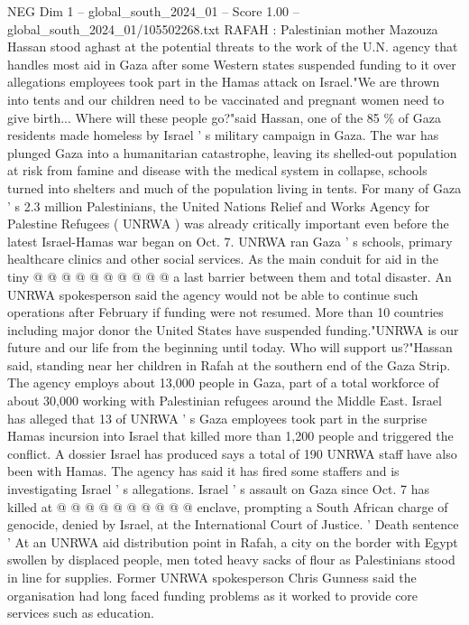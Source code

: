 \begin{textsample}{NEG Dim 1 – global\_south\_2024\_01 – Score 1.00 – global\_south\_2024\_01/105502268.txt}  \label{ex:f1_neg_352}
RAFAH : Palestinian mother Mazouza Hassan stood aghast at the potential threats to the work of the U.N. agency that handles most aid in Gaza after some Western states suspended funding to it over allegations employees took part in the Hamas attack on Israel."We are thrown into tents and our children need to be vaccinated and pregnant women need to give birth...
Where will these people go?"said Hassan, one of the 85 \% of Gaza residents made homeless by Israel ' s military campaign in Gaza.
The war has plunged Gaza into a humanitarian catastrophe, leaving its shelled-out population at risk from famine and disease with the medical system in collapse, schools turned into shelters and much of the population living in tents.
For many of Gaza ' s 2.3 million Palestinians, the United Nations Relief and Works Agency for Palestine Refugees ( UNRWA ) was already critically important even before the latest Israel-Hamas war began on Oct. 7.
UNRWA ran Gaza ' s schools, primary healthcare clinics and other social services.
As the main conduit for aid in the tiny @ @ @ @ @ @ @ @ @ @ a last barrier between them and total disaster.
An UNRWA spokesperson said the agency would not be able to continue such operations after February if funding were not resumed.
More than 10 countries including major donor the United States have suspended funding."UNRWA is our future and our life from the beginning until today.
Who will support us?"Hassan said, standing near her children in Rafah at the southern end of the Gaza Strip.
The agency employs about 13,000 people in Gaza, part of a total workforce of about 30,000 working with Palestinian refugees around the Middle East.
Israel has alleged that 13 of UNRWA ' s Gaza employees took part in the surprise Hamas incursion into Israel that killed more than 1,200 people and triggered the conflict.
A dossier Israel has produced says a total of 190 UNRWA staff have also been with Hamas.
The agency has said it has fired some staffers and is investigating Israel ' s allegations.
Israel ' s assault on Gaza since Oct. 7 has killed at @ @ @ @ @ @ @ @ @ @ enclave, prompting a South African charge of genocide, denied by Israel, at the International Court of Justice. ' Death sentence ' At an UNRWA aid distribution point in Rafah, a city on the border with Egypt swollen by displaced people, men toted heavy sacks of flour as Palestinians stood in line for supplies.
Former UNRWA spokesperson Chris Gunness said the organisation had long faced funding problems as it worked to provide core services such as education.

\end{textsample}

